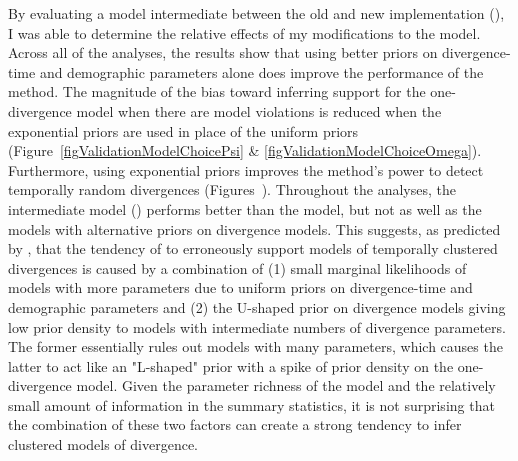 By evaluating a model intermediate between the old and new implementation
(\modelUshaped), I was able to determine the relative effects of my 
modifications to the model.
Across all of the analyses, the results show that using better priors on
divergence-time and demographic parameters alone does improve the performance
of the method.
The magnitude of the bias toward inferring support for the one-divergence
model when there are model violations is reduced when the exponential
priors are used in place of the uniform priors
(Figure~\ref{figValidationModelChoicePsi} \&
\ref{figValidationModelChoiceOmega}).
Furthermore, using exponential priors improves the method's power to detect
temporally random divergences
(Figures~).
Throughout the analyses, the intermediate model (\modelUshaped) performs better
than the \msb model, but not as well as the models with alternative priors on
divergence models.
This suggests, as predicted by \citet{Oaks2012}, that the tendency of \msb to
erroneously support models of temporally clustered divergences is caused by a
combination of
(1) small marginal likelihoods of models with more \divTime{} parameters due to
uniform priors on divergence-time and demographic parameters and
(2) the U-shaped prior on divergence models giving low prior density to models
with intermediate numbers of divergence parameters.
The former essentially rules out models with many \divTime{} parameters, which
causes the latter to act like an "L-shaped" prior with a spike of
prior density on the one-divergence model.
Given the parameter richness of the model and the relatively small amount of
information in the summary statistics, it is not surprising that the
combination of these two factors can create a strong tendency to infer
clustered models of divergence.

